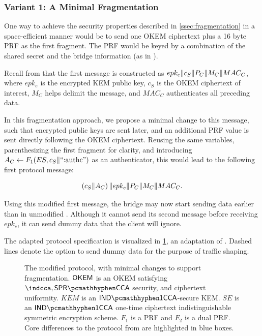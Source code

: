 \subsubsection{Variant 1: A Minimal Fragmentation} \label{sssec:variant-minimal}

One way to achieve the security properties described in \cref{ssec:fragmentation} in a space-efficient manner would be to send one OKEM ciphertext plus a 16 byte PRF as the first fragment. The PRF would be keyed by a combination of the shared secret and the bridge information (as in \drivel{}).

Recall from \cite[Figure~6]{EPRINT:GRSV25} that the first \drivel{} message is constructed as $epk_e \| c_S \| P_C \| M_C \| MAC_C$, where $epk_e$ is the encrypted KEM public key, $c_S$ is the OKEM ciphertext of interest, $M_C$ helps delimit the message, and $MAC_C$ authenticates all preceding data.

In this fragmentation approach, we propose a minimal change to this message, such that encrypted public keys are sent later, and an additional PRF value is sent directly following the OKEM ciphertext. Reusing the same variables, parenthesizing the first fragment for clarity, and introducing $A_C \gets F_1(ES, c_S \| \text{``:authc''})$ as an authenticator, this would lead to the following first protocol message:

\[
    \left( c_S \| A_C \right) \| epk_e \| P_C \| M_C \| MAC_C .
\]

Using this modified first message, the bridge may now start sending data earlier than in unmodified \drivel{}. Although it cannot send its second message before receiving $epk_e$, it can send dummy data that the client will ignore.

The adapted protocol specification is visualized in \cref{fig:modified-drivel-minimal}, an adaptation of \cite[Figure~6]{EPRINT:GRSV25}. Dashed lines denote the option to send dummy data for the purpose of traffic shaping.

\begin{figure}
    
    \caption[
        The modified \drivel{} protocol, with minimal changes to support fragmentation.
    ]{
        The modified \drivel{} protocol, with minimal changes to support fragmentation.
        $\mathsf{OKEM}$ is an OKEM satisfying $\indcca, \sprcca$ security, and ciphertext uniformity.
        $KEM$ is an $\indonecca$-secure KEM.
        $SE$ is an $\indonecca$ one-time ciphertext indistinguishable symmetric encryption scheme.
        $F_1$ is a PRF and $F_2$ is a dual PRF.
        Core differences to the \drivel{} protocol from \cite[Figure~6]{EPRINT:GRSV25} are highlighted in blue boxes.
    }
    \label{fig:modified-drivel-minimal}
\end{figure}

